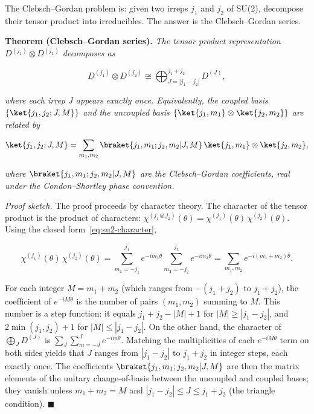 The Clebsch--Gordan problem is: given two irreps $j_1$ and $j_2$ of SU(2), decompose their tensor product into irreducibles. The answer is the Clebsch--Gordan series.

\medskip\noindent\textbf{Theorem (Clebsch--Gordan series).} \emph{The tensor product representation $D^{(j_1)} \otimes D^{(j_2)}$ decomposes as}
\begin{linenomath}
    \begin{equation}
        D^{(j_1)} \otimes D^{(j_2)} \cong \bigoplus_{J = |j_1 - j_2|}^{j_1 + j_2} D^{(J)},
        \label{eq:app-cg-series}
    \end{equation}
\end{linenomath}
\emph{where each irrep $J$ appears exactly once. Equivalently, the coupled basis $\{\ket{j_1,j_2;J,M}\}$ and the uncoupled basis $\{\ket{j_1,m_1} \otimes \ket{j_2,m_2}\}$ are related by}
\begin{linenomath}
    \begin{equation}
        \ket{j_1,j_2;J,M} = \sum_{m_1,m_2} \braket{j_1,m_1;j_2,m_2|J,M}\,\ket{j_1,m_1} \otimes \ket{j_2,m_2},
        \label{eq:cg-expansion}
    \end{equation}
\end{linenomath}
\emph{where $\braket{j_1,m_1;j_2,m_2|J,M}$ are the Clebsch--Gordan coefficients, real under the Condon--Shortley phase convention.}

\medskip\noindent\textit{Proof sketch.} The proof proceeds by character theory. The character of the tensor product is the product of characters: $\chi^{(j_1 \otimes j_2)}(\theta) = \chi^{(j_1)}(\theta)\,\chi^{(j_2)}(\theta)$. Using the closed form~\eqref{eq:su2-character},
\begin{linenomath}
    \begin{equation}
        \chi^{(j_1)}(\theta)\,\chi^{(j_2)}(\theta)
        = \sum_{m_1=-j_1}^{j_1} e^{-im_1\theta} \sum_{m_2=-j_2}^{j_2} e^{-im_2\theta}
        = \sum_{m_1,m_2} e^{-i(m_1+m_2)\theta}.
        \label{eq:product-character}
    \end{equation}
\end{linenomath}
For each integer $M = m_1 + m_2$ (which ranges from $-(j_1+j_2)$ to $j_1+j_2$), the coefficient of $e^{-iM\theta}$ is the number of pairs $(m_1,m_2)$ summing to $M$. This number is a step function: it equals $j_1+j_2 - |M| + 1$ for $|M| \ge |j_1-j_2|$, and $2\min(j_1,j_2)+1$ for $|M| \le |j_1-j_2|$. On the other hand, the character of $\bigoplus_J D^{(J)}$ is $\sum_J \sum_{m=-J}^J e^{-im\theta}$. Matching the multiplicities of each $e^{-iM\theta}$ term on both sides yields that $J$ ranges from $|j_1-j_2|$ to $j_1+j_2$ in integer steps, each exactly once. The coefficients $\braket{j_1,m_1;j_2,m_2|J,M}$ are then the matrix elements of the unitary change-of-basis between the uncoupled and coupled bases; they vanish unless $m_1+m_2 = M$ and $|j_1-j_2| \le J \le j_1+j_2$ (the triangle condition). \hfill $\blacksquare$

